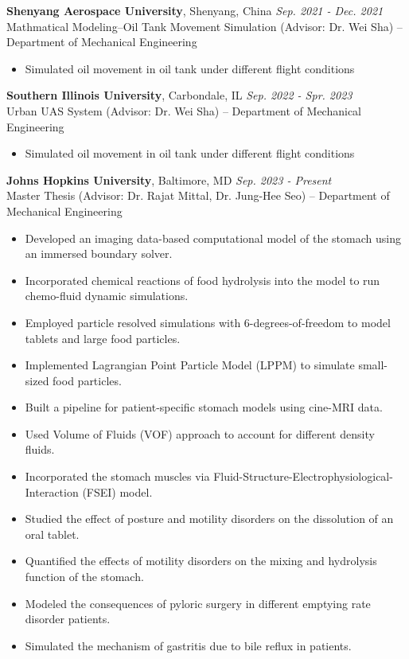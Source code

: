 \documentclass[11pt]{article}
\begin{document}
\noindent\textbf{Shenyang Aerospace University}, Shenyang, China \hfill \textit{Sep. 2021 - Dec. 2021} \\
Mathmatical Modeling--Oil Tank Movement Simulation (Advisor: Dr. Wei Sha) – Department of Mechanical Engineering
\begin{itemize}[leftmargin=*,itemsep=1pt]

    \item Simulated oil movement in oil tank under different flight conditions
\end{itemize}

\noindent\textbf{Southern Illinois University}, Carbondale, IL \hfill \textit{Sep. 2022 - Spr. 2023} \\
Urban UAS System  (Advisor: Dr. Wei Sha) – Department of Mechanical Engineering
\begin{itemize}[leftmargin=*,itemsep=1pt]

    \item Simulated oil movement in oil tank under different flight conditions
\end{itemize}








\noindent\textbf{Johns Hopkins University}, Baltimore, MD \hfill \textit{Sep. 2023 - Present} \\
Master Thesis (Advisor: Dr. Rajat Mittal, Dr. Jung-Hee Seo) – Department of Mechanical Engineering
\begin{itemize}[leftmargin=*,itemsep=1pt]
    
    \item Developed an imaging data-based computational model of the stomach using an immersed boundary solver.
    \item Incorporated chemical reactions of food hydrolysis into the model to run chemo-fluid dynamic simulations.
    \item Employed particle resolved simulations with 6-degrees-of-freedom to model tablets and large food particles.
    \item Implemented Lagrangian Point Particle Model (LPPM) to simulate small-sized food particles.
    \item Built a pipeline for patient-specific stomach models using cine-MRI data.
    \item Used Volume of Fluids (VOF) approach to account for different density fluids.
    \item Incorporated the stomach muscles via Fluid-Structure-Electrophysiological-Interaction (FSEI) model.
    \item Studied the effect of posture and motility disorders on the dissolution of an oral tablet.
    \item Quantified the effects of motility disorders on the mixing and hydrolysis function of the stomach.
    \item Modeled the consequences of pyloric surgery in different emptying rate disorder patients.
    \item Simulated the mechanism of gastritis due to bile reflux in patients.
\end{itemize}
\end{document}
